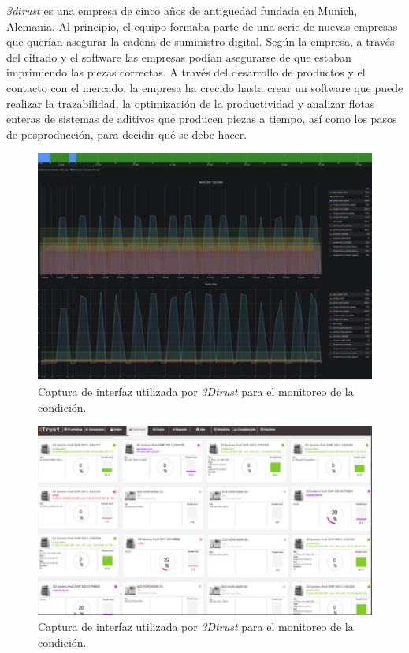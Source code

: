 \textit{3dtrust} es una empresa de cinco años de antiguedad fundada en Munich, Alemania. Al principio, el equipo formaba parte de una serie de nuevas empresas que querían asegurar la cadena de suministro digital. Según la empresa, a través del cifrado y el software las empresas podían asegurarse de que estaban imprimiendo las piezas correctas. A través del desarrollo de productos y el contacto con el mercado, la empresa ha crecido hasta  crear un software que puede realizar la trazabilidad, la optimización de la productividad y analizar flotas enteras de sistemas de aditivos que producen piezas a tiempo, así como los pasos de posproducción, para decidir qué se debe hacer.

\begin{figure}[H]
\centering
\includegraphics[scale=1]{images/3dtmonitoreo.png}
\caption{Captura de interfaz utilizada por \textit{3Dtrust} para el monitoreo de la condición.}
\label{3dtmonitoreo}
\end{figure}

\begin{figure}[H]
\centering
\includegraphics[scale=1]{images/3dtmonitoreo2.png}
\caption{Captura de interfaz utilizada por \textit{3Dtrust} para el monitoreo de la condición.}
\label{3dtmonitoreo2}
\end{figure}

